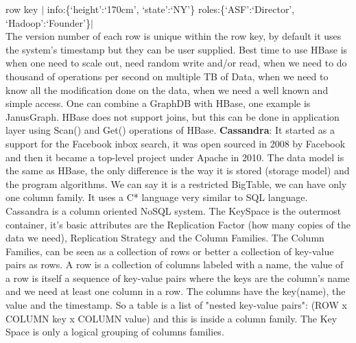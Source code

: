 \documentclass[a4page, 11pt]{article}
\begin{document}
row key $|$ info:\{`height':`170cm', `state':`NY'\}  roles:\{`ASF':`Director', `Hadoop':`Founder'\}$|$\\
The version number of each row is unique within the row key, by default it uses the system's timestamp but they can be user supplied.
\newline
Best time to use HBase is when one need to scale out, need random write and/or read, when we need to do thousand of operations per second on multiple TB of Data, when we need to know all the modification done on
the data, when we need a well known and simple access. One can combine a GraphDB with HBase, one example is JanusGraph.
HBase does not support joins, but this can be done in application layer using Scan() and Get() operations of HBase.
\newline
\newline
\textbf{Cassandra\cite{Facebook}}: It started as a support for the Facebook inbox search, it was open sourced in 2008 by Facebook and then it became a top-level project under Apache in 2010. The data model is the same as HBase, the only difference is the way it is stored (storage model) and the program algorithms. We can say it is a restricted BigTable, we can have only one column family. It uses a C* language very similar to SQL language.
\newline
Cassandra is a column oriented NoSQL system. 
The KeySpace is the outermost container, it's basic attributes are the Replication Factor (how many copies of the data we need), Replication Strategy and the Column Families.
The Column Families, can be seen as a collection of rows or better a collection of key-value pairs as rows. 
A row is a collection of columns labeled with a name, the value of a row is itself a sequence of key-value pairs where the keys are the column's name and we need at least one column in a row. The columns have the key(name), the value and the timestamp. So a table is a list of "nested key-value pairs": (ROW x COLUMN key x COLUMN value) and this is inside a column family.
The Key Space is only a logical grouping of columns families.
\end{document}
